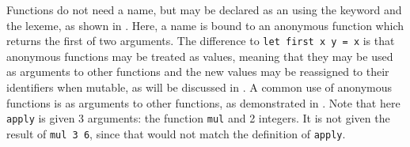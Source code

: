 \documentclass[fsharpNotes.tex]{subfiles}
\begin{document}
Functions do not need a name, but may be declared as an \label{page:anonymousFunction} using the  keyword and the \idx[->@\lstinline{->}]{\lexeme{->}} lexeme, as shown in .
%
%
Here, a name is bound to an anonymous function which returns the first of two arguments. The difference to \lstinline!let first x y = x! is that anonymous functions may be treated as values, meaning that they may be used as arguments to other functions and the new values may be reassigned to their identifiers when mutable, as will be discussed in . A common use of anonymous functions is as arguments to other functions, as demonstrated in .
%
%
Note that here \lstinline!apply! is given 3 arguments: the function \lstinline!mul! and 2 integers. It is not given the result of \lstinline!mul 3 6!, since that would not match the definition of \lstinline!apply!. 
\end{document}
